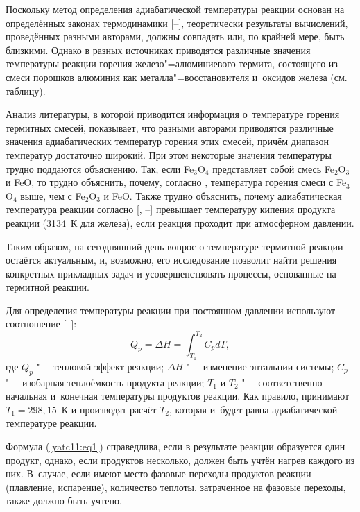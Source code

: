 Поскольку метод определения адиабатической температуры реакции основан на определённых законах термодинамики [--],  теоретически результаты вычислений, проведённых разными авторами, должны совпадать или, по крайней мере, быть близкими. 
Однако в разных источниках приводятся различные значения температуры реакции горения железо"=алюминиевого термита, состоящего из смеси порошков алюминия как металла"=восстановителя и~оксидов железа (см. таблицу).%




Анализ литературы, в которой приводится информация о~температуре горения термитных смесей, показывает, что разными авторами
приводятся различные значения адиабатических температур горения этих смесей, причём диапазон температур достаточно широкий. 
При этом некоторые значения температуры трудно поддаются объяснению. Так, если Fe$_3$O$_4$ представляет собой смесь Fe$_2$O$_3$ и FeO, то трудно объяснить, почему, согласно \cite{yatc11:bib6,yatc11:bib10}, температура горения смеси с Fe$_3$O$_4$ выше, чем с Fe$_2$O$_3$ и FeO. 
Также трудно объяснить, почему адиабатическая температура реакции согласно [, --] превышает температуру
кипения продукта реакции (3134~К для железа), если реакция проходит при
атмосферном давлении.

Таким образом, на сегодняшний день вопрос о температуре термитной реакции
остаётся актуальным, и, возможно, его исследование позволит найти решения
конкретных прикладных задач и усовершенствовать процессы, основанные на
термитной реакции.

\smallskip

\hypertarget{ya:p:1}{}

Для определения температуры реакции при постоянном давлении используют соотношение
[--]:
\begin{equation}
\label{yatc11:eq1}
Q_p =\Delta H = \int_{T_1}^{T_2} C_p dT,
\end{equation}
где $Q_p$ "--- тепловой эффект реакции; 
$\Delta H$ "--- изменение энтальпии системы; \linebreak
$C_p$ "--- изобарная теплоёмкость продукта реакции;
$T_1$ и $T_2$ "--- соответственно начальная и~конечная температуры продуктов реакции. 
Как правило, принимают $T_1=298,15$~К и производят расчёт $T_2$, которая и~будет равна адиабатической температуре реакции.

Формула (\ref{yatc11:eq1}) справедлива, если в результате реакции образуется один продукт, однако, если продуктов несколько, должен быть учтён нагрев каждого из них. 
В~случае, если имеют место фазовые переходы продуктов реакции (плавление, испарение), количество теплоты, затраченное на фазовые переходы, также должно быть учтено.

